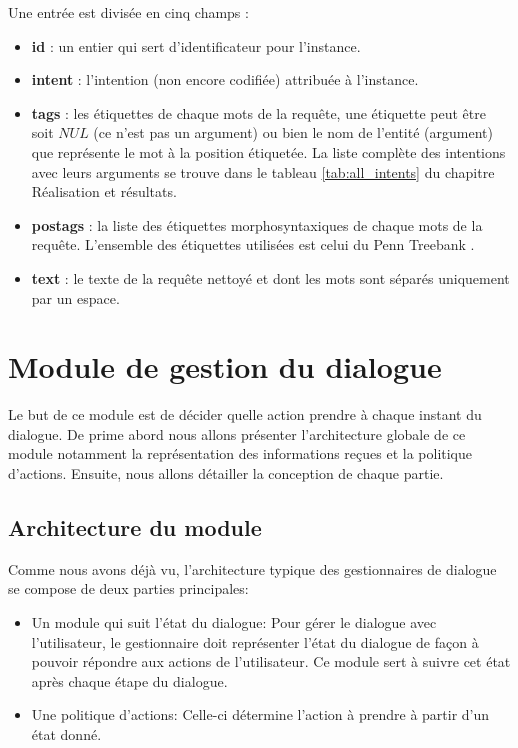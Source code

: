 		\par
		\newpage
		Une entrée est divisée en cinq champs :
		\begin{itemize}
			\item \textbf{id} : un entier qui sert d'identificateur pour l'instance.
			\item \textbf{intent} : l'intention (non encore codifiée) attribuée à l'instance.
			\item \textbf{tags} : les étiquettes de chaque mots de la requête, une étiquette peut être soit $NUL$ (ce n'est pas un argument) ou bien le nom de l'entité (argument) que représente le mot à la position étiquetée. La liste complète des intentions avec leurs arguments se trouve dans le tableau \ref{tab:all_intents} du chapitre Réalisation et résultats.
			\item \textbf{postags} : la liste des étiquettes morphosyntaxiques de chaque mots de la requête. L'ensemble des étiquettes utilisées est celui du Penn Treebank \cite{penn_treebank}.
			\item \textbf{text} : le texte de la requête nettoyé et dont les mots sont séparés uniquement par un espace.
		\end{itemize}
\section{Module de gestion du dialogue}
Le but de ce module est de décider quelle action prendre à chaque instant du dialogue. De prime abord nous allons présenter l'architecture globale de ce module notamment la représentation des informations reçues et la politique d'actions. Ensuite, nous allons détailler la conception de chaque partie.
\subsection{Architecture du module}
Comme nous avons déjà vu, l'architecture typique des gestionnaires de dialogue se compose de deux parties principales: 
\begin{itemize}
	\item Un module qui suit l'état du dialogue: Pour gérer le dialogue avec l'utilisateur, le gestionnaire doit représenter l'état du dialogue de façon à pouvoir répondre aux actions de l'utilisateur. Ce module sert à suivre cet état après chaque étape du dialogue.
	\item Une politique d'actions: Celle-ci détermine l'action à prendre à partir d'un état donné.
\end{itemize}
